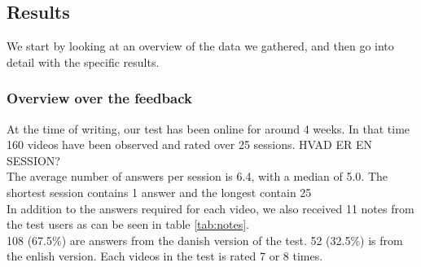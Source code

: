 \subsection{Results}
%
We start by looking at an overview of the data we gathered, and then go into detail with the specific results.
%
\subsubsection{Overview over the feedback}
%
At the time of writing, our test has been online for around 4 weeks. In that time 160 videos have been observed and rated over 25 sessions. HVAD ER EN SESSION?\\
The average number of answers per session is 6.4, with a median of 5.0. The shortest session contains 1 answer and the longest contain 25\\
In addition to the answers required for each video, we also received 11 notes from the test users as can be seen in table \ref{tab:notes}.\\
108 (67.5\%) are answers from the danish version of the test. 52 (32.5\%) is from the enlish version. Each videos in the test is rated 7 or 8 times.
%
